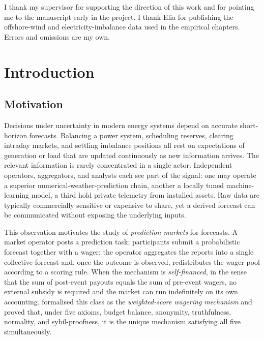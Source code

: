 \documentclass[
  11pt,
  a4paper,
  oneside]{report}
\begin{document}
I thank my supervisor for supporting the direction of this work and for
pointing me to the \citet{vitali2025intermittent} manuscript early in
the project. I thank Elia for publishing the offshore-wind and
electricity-imbalance data used in the empirical chapters. Errors and
omissions are my own.

\cleardoublepage
\tableofcontents
\cleardoublepage


\chapter{Introduction}\label{ch:intro}

\section{Motivation}\label{motivation}

Decisions under uncertainty in modern energy systems depend on accurate
short-horizon forecasts. Balancing a power system, scheduling reserves,
clearing intraday markets, and settling imbalance positions all rest on
expectations of generation or load that are updated continuously as new
information arrives. The relevant information is rarely concentrated in
a single actor. Independent operators, aggregators, and analysts each
see part of the signal: one may operate a superior
numerical-weather-prediction chain, another a locally tuned
machine-learning model, a third hold private telemetry from installed
assets. Raw data are typically commercially sensitive or expensive to
share, yet a derived forecast can be communicated without exposing the
underlying inputs.

This observation motivates the study of \emph{prediction markets} for
forecasts. A market operator posts a prediction task; participants
submit a probabilistic forecast together with a wager; the operator
aggregates the reports into a single collective forecast and, once the
outcome is observed, redistributes the wager pool according to a scoring
rule. When the mechanism is \emph{self-financed}, in the sense that the
sum of post-event payouts equals the sum of pre-event wagers, no
external subsidy is required and the market can run indefinitely on its
own accounting. \citet{lambert2008selffinanced} formalised this class as
the \emph{weighted-score wagering mechanism} and proved that, under five
axioms, budget balance, anonymity, truthfulness, normality, and
sybil-proofness, it is the unique mechanism satisfying all five
simultaneously.
\end{document}
